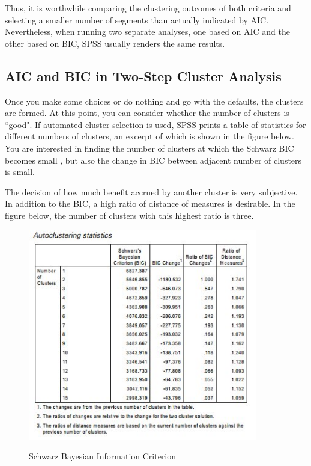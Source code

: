 \documentclass[a4paper,12pt]{article}
\begin{document}
Thus, it is worthwhile comparing the clustering
outcomes of both criteria and selecting a smaller number of segments than
actually indicated by AIC. Nevertheless, when running two separate analyses,
one based on AIC and the other based on BIC, SPSS usually renders the same
results.

\subsection{AIC and BIC in Two-Step Cluster Analysis}






Once you make some choices or do nothing and go with the defaults, the clusters are
formed. At this point, you can consider whether the number of clusters is ``good". If
automated cluster selection is used, SPSS prints a table of statistics for different
numbers of clusters, an excerpt of which is shown in the figure below. You are interested
in finding the number of clusters at which the Schwarz BIC becomes small , but also the change in BIC between
adjacent number of clusters is small. 

The decision of how much benefit accrued by another cluster is very subjective. In addition to the BIC, a high ratio of distance of measures is desirable. In the figure below, the number of clusters with this highest ratio is three.

\begin{figure}[h!]
	\begin{centering}
		\includegraphics[width=10cm]{images/TwoStep1.jpg}\\
		\caption{Schwarz Bayesian Information Criterion}
	\end{centering}
\end{figure}
\end{document}

